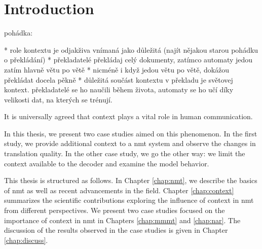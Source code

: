 \chapter{Introduction}
\label{chap:intro}

\begin{markdown}

pohádka:

* role kontextu je odjakživa vnímaná jako důležitá (najít nějakou starou pohádku o překládání)
* překladatelé překládaj celý dokumenty, zatímco automaty jedou zatím hlavně větu po větě
* nicméně i když jedou větu po větě, dokážou překládat docela pěkně
* důležitá součást kontextu v překladu je světovej kontext. překladatelé se ho naučili během života, automaty se ho učí díky velikosti dat, na kterých se trénují.

\end{markdown}

It is universally agreed that context plays a vital role in human communication.


In this thesis, we present two case studies aimed on this phenomenon. In the
first study, we provide additional context to a \gls{nmt} system and observe the
changes in translation quality. In the other case study, we go the other way: we
limit the context available to the decoder and examine the model behavior.

This thesis is structured as follows. In Chapter \ref{chap:nmt}, we describe the
basics of \gls{nmt} as well as recent advancements in the field. Chapter
\ref{chap:context} summarizes the scientific contributions exploring the
influence of context in \gls{nmt} from different perspectives. We present two
case studies focused on the importance of context in \gls{nmt} in Chapters
\ref{chap:mmmt} and \ref{chap:nar}. The discussion of the results observed in
the case studies is given in Chapter \ref{chap:discuss}.
